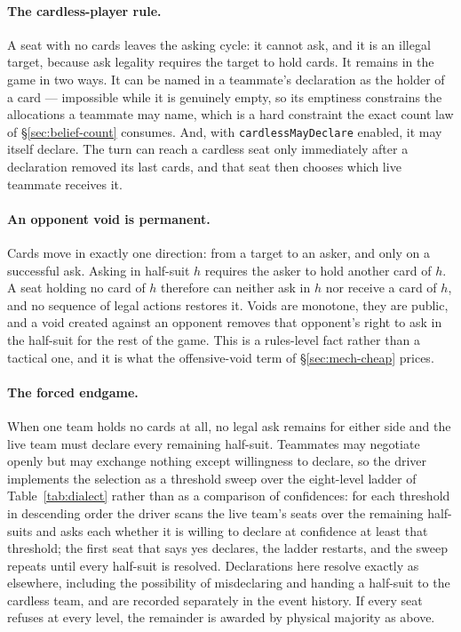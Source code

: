 \paragraph{The cardless-player rule.} A seat with no cards leaves the asking
cycle: it cannot ask, and it is an illegal target, because ask legality requires
the target to hold cards. It remains in the game in two ways. It can be named in
a teammate's declaration as the holder of a card --- impossible while it is
genuinely empty, so its emptiness constrains the allocations a teammate may
name, which is a hard constraint the exact count law of
\S\ref{sec:belief-count} consumes. And, with \texttt{cardlessMayDeclare}
enabled, it may itself declare. The turn can reach a cardless seat only
immediately after a declaration removed its last cards, and that seat then
chooses which live teammate receives it.

\paragraph{An opponent void is permanent.} Cards move in exactly one direction:
from a target to an asker, and only on a successful ask. Asking in half-suit $h$
requires the asker to hold another card of $h$. A seat holding no card of $h$
therefore can neither ask in $h$ nor receive a card of $h$, and no sequence of
legal actions restores it. Voids are monotone, they are public, and a void
created against an opponent removes that opponent's right to ask in the
half-suit for the rest of the game. This is a rules-level fact rather than a
tactical one, and it is what the offensive-void term of \S\ref{sec:mech-cheap}
prices.

\paragraph{The forced endgame.} When one team holds no cards at all, no legal
ask remains for either side and the live team must declare every remaining
half-suit. Teammates may negotiate openly but may exchange nothing except
willingness to declare, so the driver implements the selection as a threshold
sweep over the eight-level ladder of Table~\ref{tab:dialect} rather than as a
comparison of confidences: for each threshold in descending order the driver
scans the live team's seats over the remaining half-suits and asks each whether
it is willing to declare at confidence at least that threshold; the first seat
that says yes declares, the ladder restarts, and the sweep repeats until every
half-suit is resolved. Declarations here resolve exactly as elsewhere, including
the possibility of misdeclaring and handing a half-suit to the cardless team,
and are recorded separately in the event history. If every seat refuses at every
level, the remainder is awarded by physical majority as above.

